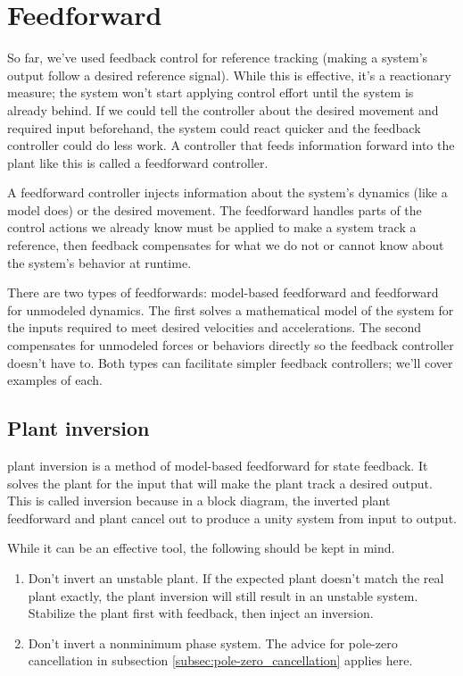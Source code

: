 \section{Feedforward}

So far, we've used feedback control for \gls{reference} \gls{tracking} (making a
\gls{system}'s output follow a desired \gls{reference} signal). While this is
effective, it's a reactionary measure; the \gls{system} won't start applying
\gls{control effort} until the \gls{system} is already behind. If we could tell
the \gls{controller} about the desired movement and required input beforehand,
the \gls{system} could react quicker and the feedback \gls{controller} could do
less work. A \gls{controller} that feeds information forward into the
\gls{plant} like this is called a \gls{feedforward controller}.

A \gls{feedforward controller} injects information about the \gls{system}'s
dynamics (like a \gls{model} does) or the desired movement. The feedforward
handles parts of the control actions we already know must be applied to make a
\gls{system} track a \gls{reference}, then feedback compensates for what we do
not or cannot know about the \gls{system}'s behavior at runtime.

There are two types of feedforwards: model-based feedforward and feedforward for
unmodeled dynamics. The first solves a mathematical model of the system for the
inputs required to meet desired velocities and accelerations. The second
compensates for unmodeled forces or behaviors directly so the feedback
controller doesn't have to. Both types can facilitate simpler feedback
controllers; we'll cover examples of each.

\subsection{Plant inversion}
\label{subsec:plant_inversion}

\Gls{plant} inversion is a method of model-based feedforward for \gls{state}
feedback. It solves the \gls{plant} for the input that will make the \gls{plant}
track a desired output. This is called inversion because in a block diagram, the
inverted \gls{plant} feedforward and \gls{plant} cancel out to produce a unity
system from input to output.

While it can be an effective tool, the following should be kept in mind.
\begin{enumerate}
  \item Don't invert an unstable \gls{plant}. If the expected \gls{plant}
    doesn't match the real \gls{plant} exactly, the \gls{plant} inversion will
    still result in an unstable \gls{system}. Stabilize the \gls{plant} first
    with feedback, then inject an inversion.
  \item Don't invert a nonminimum phase system. The advice for pole-zero
    cancellation in subsection \ref{subsec:pole-zero_cancellation} applies here.
\end{enumerate}

